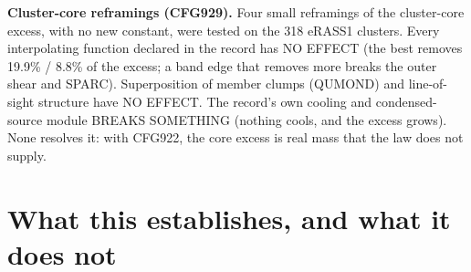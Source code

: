 \documentclass[10pt]{article}
\begin{document}
\textbf{Cluster-core reframings (CFG929).} Four small reframings of the cluster-core excess, with no new constant, were tested on the 318 eRASS1 clusters. Every interpolating function declared in the record has NO EFFECT (the best removes 19.9\% / 8.8\% of the excess; a band edge that removes more breaks the outer shear and SPARC). Superposition of member clumps (QUMOND) and line-of-sight structure have NO EFFECT. The record's own cooling and condensed-source module BREAKS SOMETHING (nothing cools, and the excess grows). None resolves it: with CFG922, the core excess is real mass that the law does not supply.

\section{What this establishes, and what it does not}
\end{document}

